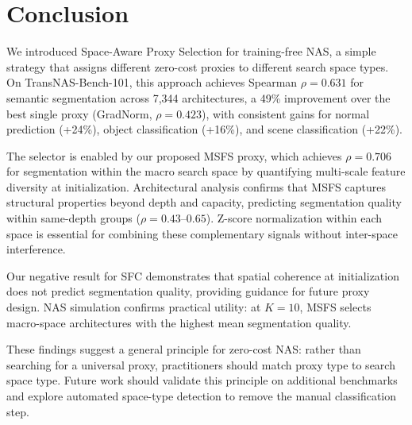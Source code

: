 \documentclass[10pt,twocolumn,letterpaper]{article}
\begin{document}
\section{Conclusion}

We introduced Space-Aware Proxy Selection for training-free NAS, a simple strategy that assigns different zero-cost proxies to different search space types.
On TransNAS-Bench-101, this approach achieves Spearman $\rho{=}0.631$ for semantic segmentation across 7{,}344 architectures, a 49\% improvement over the best single proxy (GradNorm, $\rho{=}0.423$), with consistent gains for normal prediction (+24\%), object classification (+16\%), and scene classification (+22\%).

The selector is enabled by our proposed MSFS proxy, which achieves $\rho{=}0.706$ for segmentation within the macro search space by quantifying multi-scale feature diversity at initialization.
Architectural analysis confirms that MSFS captures structural properties beyond depth and capacity, predicting segmentation quality within same-depth groups ($\rho{=}0.43$--$0.65$).
Z-score normalization within each space is essential for combining these complementary signals without inter-space interference.

Our negative result for SFC demonstrates that spatial coherence at initialization does not predict segmentation quality, providing guidance for future proxy design.
NAS simulation confirms practical utility: at $K{=}10$, MSFS selects macro-space architectures with the highest mean segmentation quality.

These findings suggest a general principle for zero-cost NAS: rather than searching for a universal proxy, practitioners should match proxy type to search space type.
Future work should validate this principle on additional benchmarks and explore automated space-type detection to remove the manual classification step.

{
    \small
    
    
}
\end{document}
